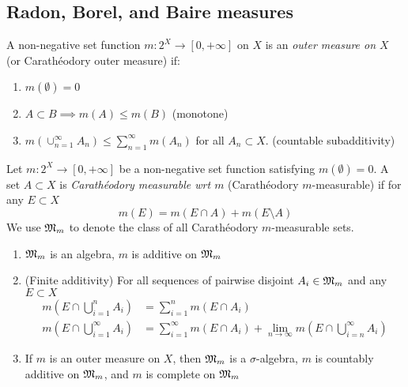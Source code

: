 \subsection{Radon, Borel, and Baire measures}

\begin{definition}
  A non-negative set function $m : 2^X \to [0, +\infty]$ on $X$
  is an \emph{outer measure on $X$} (or Carath\'eodory outer measure)
  if:
  \begin{enumerate}
    \item $m(\emptyset) = 0$
    \item $A \subset B \implies m(A) \leq m(B)$ (monotone)
    \item $m\left( \cup_{n=1}^\infty A_n\right) \leq \sum_{n=1}^\infty m(A_n)$
      for all $A_n \subset X$. (countable subadditivity)
  \end{enumerate}
\end{definition}

\begin{definition}
  Let $m : 2^X \to [0, +\infty]$ be a non-negative set function
  satisfying $m(\emptyset) = 0$.
  A set $A \subset X$ is \emph{Carath\'eodory measurable wrt
  $m$} (Carath\'eodory $m$-measurable) if for any $E \subset X$
  \[
    m(E) = m(E \cap A) + m(E \setminus A)
  \]
  We use $\mathfrak{M}_m$ to denote the class of all Carath\'eodory $m$-measurable sets.
\end{definition}

\begin{theorem}
  \begin{enumerate}
    \item $\mathfrak{M}_m$ is an algebra, $m$ is additive on $\mathfrak{M}_m$
    \item (Finite additivity) For all sequences of pairwise disjoint
      $A_i \in \mathfrak{M}_m$ and any $E \subset X$
      \begin{align*}
        m\left(E \cap \bigcup_{i=1}^n A_i\right) &= \sum_{i=1}^n m(E \cap A_i) \\
        m\left(E \cap \bigcup_{i=1}^\infty A_i\right)
        &= \sum_{i=1}^\infty m(E \cap A_i) + \lim_{n \to \infty} m\left(E \cap \bigcup_{i=n}^\infty A_i\right)
      \end{align*}
    \item If $m$ is an outer measure on $X$, then $\mathfrak{M}_m$ is a $\sigma$-algebra,
      $m$ is countably additive on $\mathfrak{M}_m$, and
      $m$ is complete on $\mathfrak{M}_m$
  \end{enumerate}
\end{theorem}

